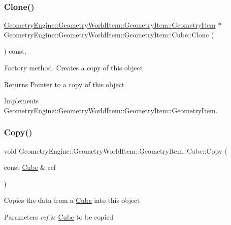 \subsubsection{\texorpdfstring{Clone()}{Clone()}}
{\footnotesize\ttfamily \mbox{\hyperlink{class_geometry_engine_1_1_geometry_world_item_1_1_geometry_item_1_1_geometry_item}{Geometry\+Engine\+::\+Geometry\+World\+Item\+::\+Geometry\+Item\+::\+Geometry\+Item}} $\ast$ Geometry\+Engine\+::\+Geometry\+World\+Item\+::\+Geometry\+Item\+::\+Cube\+::\+Clone (\begin{DoxyParamCaption}{ }\end{DoxyParamCaption}) const\hspace{0.3cm}{\ttfamily [override]}, {\ttfamily [virtual]}}

Factory method. Creates a copy of this object \begin{DoxyReturn}{Returns}
Pointer to a copy of this object 
\end{DoxyReturn}


Implements \mbox{\hyperlink{class_geometry_engine_1_1_geometry_world_item_1_1_geometry_item_1_1_geometry_item_a1db8f97339ba49f746b3e0b4c4b02748}{Geometry\+Engine\+::\+Geometry\+World\+Item\+::\+Geometry\+Item\+::\+Geometry\+Item}}.

\mbox{\label{class_geometry_engine_1_1_geometry_world_item_1_1_geometry_item_1_1_cube_a36f20733aaadc9ab22a72eb87436b900}} 
\subsubsection{\texorpdfstring{Copy()}{Copy()}}
{\footnotesize\ttfamily void Geometry\+Engine\+::\+Geometry\+World\+Item\+::\+Geometry\+Item\+::\+Cube\+::\+Copy (\begin{DoxyParamCaption}\item[{const \mbox{\hyperlink{class_geometry_engine_1_1_geometry_world_item_1_1_geometry_item_1_1_cube}{Cube}} \&}]{ref }\end{DoxyParamCaption})\hspace{0.3cm}{\ttfamily [virtual]}}

Copies the data from a \mbox{\hyperlink{class_geometry_engine_1_1_geometry_world_item_1_1_geometry_item_1_1_cube}{Cube}} into this object 
\begin{DoxyParams}{Parameters}
{\em ref} & \mbox{\hyperlink{class_geometry_engine_1_1_geometry_world_item_1_1_geometry_item_1_1_cube}{Cube}} to be copied \\
\hline
\end{DoxyParams}


